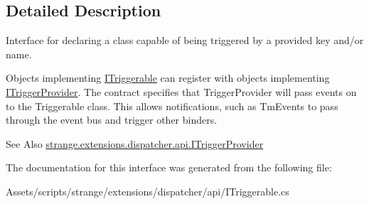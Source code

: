 \subsection{Detailed Description}
Interface for declaring a class capable of being triggered by a provided key and/or name. 

Objects implementing \hyperlink{interfacestrange_1_1extensions_1_1dispatcher_1_1api_1_1_i_triggerable}{I\-Triggerable} can register with objects implementing \hyperlink{interfacestrange_1_1extensions_1_1dispatcher_1_1api_1_1_i_trigger_provider}{I\-Trigger\-Provider}. The contract specifies that Trigger\-Provider will pass events on to the Triggerable class. This allows notifications, such as Tm\-Events to pass through the event bus and trigger other binders.

\begin{DoxySeeAlso}{See Also}
\hyperlink{interfacestrange_1_1extensions_1_1dispatcher_1_1api_1_1_i_trigger_provider}{strange.\-extensions.\-dispatcher.\-api.\-I\-Trigger\-Provider} 
\end{DoxySeeAlso}


The documentation for this interface was generated from the following file\-:\begin{DoxyCompactItemize}
\item 
Assets/scripts/strange/extensions/dispatcher/api/I\-Triggerable.\-cs\end{DoxyCompactItemize}
